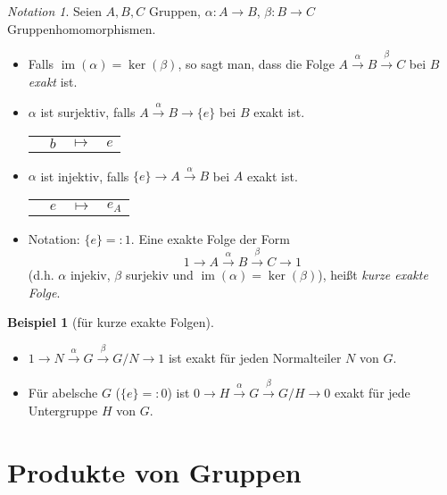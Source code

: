 \documentclass[12pt]{scrartcl} %
\DeclareMathOperator{\im}{im}
\theoremstyle{definition}
\newtheorem{ex}{Beispiel}
\theoremstyle{remark}
\newtheorem*{notation}{Notation}
\begin{document}
\begin{notation}
	Seien $A, B, C$ Gruppen, $\alpha: A \rightarrow B$, $\beta: B \rightarrow C$ Gruppenhomomorphismen.
	\begin{itemize}
	\item Falls $\im(\alpha) = \ker(\beta)$, so sagt man, dass die Folge $A \stackrel{\alpha}{\longrightarrow} B \stackrel{\beta}{\longrightarrow} C$ bei $B$ \emph{exakt} ist.
	\item $\alpha$ ist surjektiv, falls $A \stackrel{\alpha}{\longrightarrow} B \longrightarrow \{e\}$ bei $B$ exakt ist. \\
		\begin{tabular}{p{4.3cm}p{.1cm}p{.3cm}l}
			& $b$ & $\mapsto$ & $e$
		\end{tabular}
	\item $\alpha$ ist injektiv, falls $\{e\} \longrightarrow A \stackrel{\alpha}{\longrightarrow} B$ bei $A$ exakt ist. \\
		\begin{tabular}{p{3.1cm}p{.1cm}p{.3cm}l}
			& $e$ & $\mapsto$ & $e_A$
		\end{tabular}
	\item Notation: $\{e\} =: 1$. Eine exakte Folge der Form
		$$ 1 \longrightarrow A \stackrel{\alpha}{\longrightarrow} B \stackrel{\beta}{\longrightarrow} C \longrightarrow 1$$
		(d.h. $\alpha$ injekiv, $\beta$ surjekiv und $\im(\alpha) = \ker(\beta)$), heißt \emph{kurze exakte Folge}.
	\end{itemize}
\end{notation}

\begin{ex}[für kurze exakte Folgen]
	\begin{itemize}
	\item $1 \longrightarrow N \stackrel{\alpha}{\longrightarrow} G \stackrel{\beta}{\longrightarrow} G/N \longrightarrow 1$ ist exakt für jeden Normalteiler $N$ von $G$.
	\item Für abelsche \(G\) ($\{e\} =: 0$) ist \(0 \longrightarrow H \stackrel{\alpha}{\longrightarrow} G \stackrel{\beta}{\longrightarrow} G/H \longrightarrow 0\) exakt für jede Untergruppe $H$ von $G$.
	\end{itemize}
\end{ex}

\section{Produkte von Gruppen}
\end{document}
